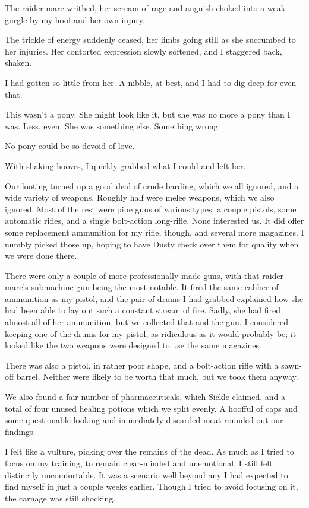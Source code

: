 The raider mare writhed, her scream of rage and anguish choked into a weak gurgle by my hoof and her own injury.

The trickle of energy suddenly ceased, her limbs going still as she succumbed to her injuries. Her contorted expression slowly softened, and I staggered back, shaken.

I had gotten so little from her. A nibble, at best, and I had to dig deep for even that.

This wasn’t a pony. She might look like it, but she was no more a pony than I was. Less, even. She was something else. Something wrong.

No pony could be so devoid of love.

With shaking hooves, I quickly grabbed what I could and left her.

Our looting turned up a good deal of crude barding, which we all ignored, and a wide variety of weapons. Roughly half were melee weapons, which we also ignored. Most of the rest were pipe guns of various types: a couple pistols, some automatic rifles, and a single bolt-action long-rifle. None interested us. It did offer some replacement ammunition for my rifle, though, and several more magazines. I numbly picked those up, hoping to have Dusty check over them for quality when we were done there.

There were only a couple of more professionally made guns, with that raider mare’s submachine gun being the most notable. It fired the same caliber of ammunition as my pistol, and the pair of drums I had grabbed explained how she had been able to lay out such a constant stream of fire. Sadly, she had fired almost all of her ammunition, but we collected that and the gun. I considered keeping one of the drums for my pistol, as ridiculous as it would probably be; it looked like the two weapons were designed to use the same magazines.

There was also a pistol, in rather poor shape, and a bolt-action rifle with a sawn-off barrel. Neither were likely to be worth that much, but we took them anyway.

We also found a fair number of pharmaceuticals, which Sickle claimed, and a total of four unused healing potions which we split evenly. A hoofful of caps and some questionable-looking and immediately discarded meat rounded out our findings.

I felt like a vulture, picking over the remains of the dead. As much as I tried to focus on my training, to remain clear-minded and unemotional, I still felt distinctly uncomfortable. It was a scenario well beyond any I had expected to find myself in just a couple weeks earlier. Though I tried to avoid focusing on it, the carnage was still shocking.

